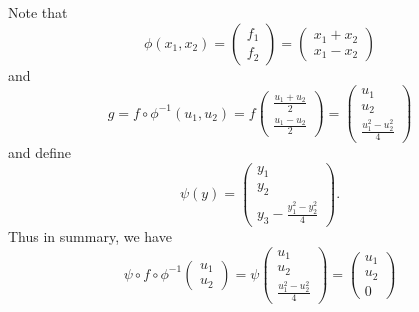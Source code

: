 \begin{example}
\begin{enumerate}
Note that
\[
\phi(x_1,x_2)=\begin{pmatrix}
f_1\\f_2
\end{pmatrix}=\begin{pmatrix}
x_1+x_2\\x_1-x_2
\end{pmatrix}
\]
and
\[
g=f\circ\phi^{-1}(u_1,u_2)=f\begin{pmatrix}
\frac{u_1+u_2}{2}\\\frac{u_1-u_2}{2}
\end{pmatrix}
=
\begin{pmatrix}
u_1\\u_2\\\frac{u_1^2-u_2^2}{4}
\end{pmatrix}
\]
and define
\[
\psi(y)=\begin{pmatrix}
y_1\\y_2\\y_3-\frac{y_1^2-y_2^2}{4}
\end{pmatrix}.
\]
Thus in summary, we have
\[
\psi\circ f\circ \phi^{-1}\begin{pmatrix}
u_1\\u_2
\end{pmatrix}=
\psi\begin{pmatrix}
u_1\\u_2\\\frac{u_1^2-u_2^2}{4}
\end{pmatrix}
=
\begin{pmatrix}
u_1\\u_2\\0
\end{pmatrix}
\]

\end{enumerate}
\end{example}
